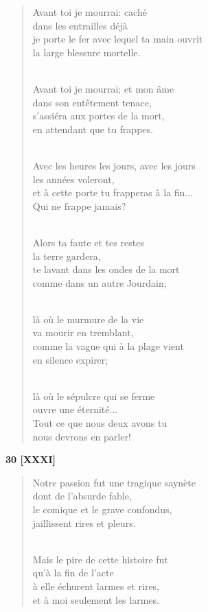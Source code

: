 \documentclass[a4paper,12pt]{book}
\begin{document}
\begin{verse}
Avant toi je mourrai: caché \\
dans les entrailles déjà \\
je porte le fer avec lequel ta main ouvrit \\
la large blessure mortelle. \\ \

Avant toi je mourrai; et mon âme \\
dans son entêtement tenace, \\
s'assiéra aux portes de la mort, \\
en attendant que tu frappes. \\ \

Avec les heures les jours, avec les jours \\
les années voleront, \\
et à cette porte tu frapperas à la fin... \\
Qui ne frappe jamais? \\ \

Alors ta faute et tes restes \\
la terre gardera, \\
te lavant dans les ondes de la mort \\
comme dans un autre Jourdain; \\ \

là où le murmure de la vie \\
va mourir en tremblant, \\
comme la vague qui à la plage vient \\
en silence expirer; \\ \

là où le sépulcre qui se ferme \\
ouvre une éternité... \\
Tout ce que nous deux avons tu \\
nous devrons en parler! \\
\end{verse}

\bigskip

\begin{center} {\bf 30 [XXXI]} \end{center}

\begin{verse}
Notre passion fut une tragique saynète \\
dont de l'absurde fable, \\
le comique et le grave confondus, \\
jaillissent rires et pleurs. \\ \

Mais le pire de cette histoire fut \\
qu'à la fin de l'acte \\
à elle échurent larmes et rires, \\
et à moi seulement les larmes. \\
\end{verse}
\end{document}
